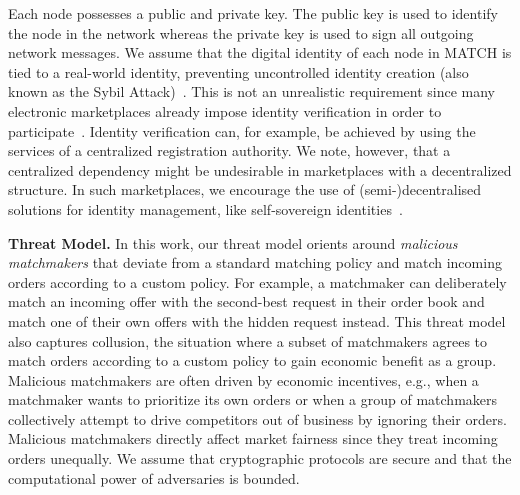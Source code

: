 Each node possesses a public and private key.
The public key is used to identify the node in the network whereas the private key is used to sign all outgoing network messages.
We assume that the digital identity of each node in MATCH is tied to a real-world identity, preventing uncontrolled identity creation (also known as the Sybil Attack)~\cite{douceur2002sybil}.
This is not an unrealistic requirement since many electronic marketplaces already impose identity verification in order to participate~\cite{damiani2003managing}.
Identity verification can, for example, be achieved by using the services of a centralized registration authority.
We note, however, that a centralized dependency might be undesirable in marketplaces with a decentralized structure.
In such marketplaces, we encourage the use of (semi-)decentralised solutions for identity management, like self-sovereign identities~\cite{muhle2018survey,stokkink2020truly}.

\textbf{Threat Model.}
In this work, our threat model orients around \emph{malicious matchmakers} that deviate from a standard matching policy and match incoming orders according to a custom policy.
For example, a matchmaker can deliberately match an incoming offer with the second-best request in their order book and match one of their own offers with the hidden request instead.
This threat model also captures collusion, the situation where a subset of matchmakers agrees to match orders according to a custom policy to gain economic benefit as a group.
Malicious matchmakers are often driven by economic incentives, e.g., when a matchmaker wants to prioritize its own orders or when a group of matchmakers collectively attempt to drive competitors out of business by ignoring their orders.
Malicious matchmakers directly affect market fairness since they treat incoming orders unequally.
We assume that cryptographic protocols are secure and that the computational power of adversaries is bounded.

